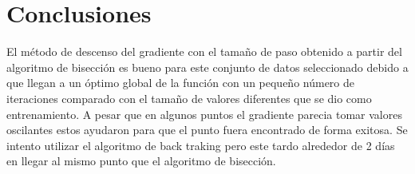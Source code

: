 \section{Conclusiones}


El método de descenso del gradiente con el tamaño de paso obtenido a partir del algoritmo de bisección es bueno para este conjunto de datos seleccionado debido a que llegan a un óptimo global de la función con un pequeño número de iteraciones comparado con el tamaño de valores diferentes que se dio como entrenamiento. A pesar que en algunos puntos el gradiente parecia tomar valores oscilantes estos ayudaron para que el punto fuera encontrado de forma exitosa. Se intento utilizar el algoritmo de back traking pero este tardo alrededor de 2 días en llegar al mismo punto que el algoritmo de bisección.